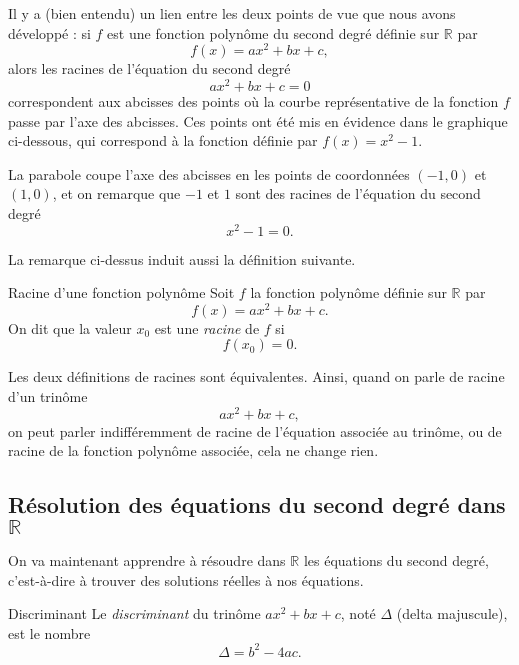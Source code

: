 \documentclass[11pt]{article}
\begin{document}
\begin{rmq}
  Il y a (bien entendu) un lien entre les deux points de vue que nous avons
  développé : si $f$ est une fonction polynôme du second degré définie sur
  $\mathbb{R}$ par
  \[
    f(x) = ax^2+bx+c,
  \]
  alors les racines de l'équation du second degré
  \[
    ax^2+bx+c = 0
  \]
  correspondent aux abcisses des points où la courbe représentative de la
  fonction $f$ passe par l'axe des abcisses. Ces points ont été mis en
  évidence dans le graphique ci-dessous, qui correspond à la fonction définie
  par $f(x) = x^2-1$.
 \begin{center}
\end{center}
La parabole coupe l'axe des abcisses en les points de coordonnées $(-1, 0)$ et
$(1, 0)$, et on remarque que $-1$ et $1$ sont des racines de l'équation du second
degré
\[
  x^2-1 = 0.
\]
\end{rmq}
La remarque ci-dessus induit aussi la définition suivante.
\begin{defi}{Racine d'une fonction polynôme}
  Soit $f$ la fonction polynôme définie sur $\mathbb{R}$ par
  \[
    f(x) = ax^2+bx+c.
  \]
  On dit que la valeur $x_0$ est une \emph{racine} de $f$ si
  \[
    f(x_0) = 0.
  \]
\end{defi}

\begin{rmq}
  Les deux définitions de racines sont équivalentes. Ainsi, quand on parle de racine d'un
  trinôme $$ax^2+bx+c,$$ on peut parler indifféremment de racine de l'équation
  associée au trinôme, ou de racine de la fonction polynôme associée, cela ne
  change rien.
\end{rmq}

\subsection{Résolution des équations du second degré dans $\mathbb{R}$}

On va maintenant apprendre à résoudre dans $\mathbb{R}$ les équations du second
degré, c'est-à-dire à trouver des solutions réelles à nos équations.

\begin{defi}{Discriminant}
  Le \emph{discriminant} du trinôme $ax^2+bx+c$, noté $\Delta$ (delta
  majuscule), est le nombre
  \[
    \Delta = b^2-4ac.
  \]
\end{defi}
\end{document}
